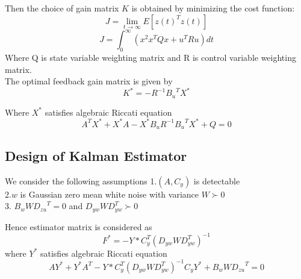 \documentclass[journal,onecolumn]{IEEEtran}
\begin{document}
Then the choice of gain matrix $K$ is obtained by minimizing the cost function:
\begin{equation}
    J = \lim_{t\to\infty} E[{z(t)}^{T}z(t)]
\end{equation}
\begin{equation}
    J = \int_{0}^{\infty} (x^2 x^TQx + u^TRu)dt
\end{equation}
Where Q is state variable weighting matrix and R is control variable weighting matrix.\\

The optimal feedback gain matrix is given by
\begin{equation}
    K^{*} = - R^{-1}{B_u}^TX^*
\end{equation}

Where $X^*$ satisfies algebraic Riccati equation 
\begin{equation}
    A^TX^* + X^*A - X^*B_uR^{-1}{B_u}^TX^* + Q = 0
\end{equation}
\subsection{Design of Kalman Estimator}
We consider the following assumptions
1.$(A,C_y)$ is detectable\\
2.$w$ is Gaussian zero mean white noise with variance $W\succ0$\\
3. $B_wW{D_{zu}}^T = 0$ and  $D_{yw}WD^{T}_{yw}\succ0$

Hence estimator matrix is considered as
\begin{equation}
    F^{*} = - Y*C^T_y(D_{yw}WD^{T}_{yw})^{-1}
\end{equation}
where $Y^*$ satisfies algebraic Riccati equation
\begin{equation}
    AY^* + Y^*A^T - Y*C^T_y(D_{yw}WD^{T}_{yw})^{-1}C_yY^* + B_wW{D_{zu}}^T = 0
\end{equation}
\end{document}
